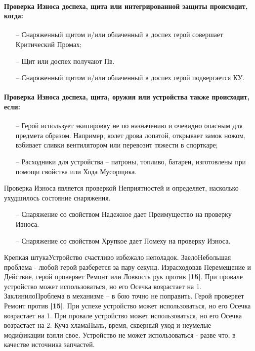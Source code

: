 \paragraph{Проверка Износа доспеха, щита или интегрированной защиты происходит, когда:}
\begin{itemize}
    \item[--] Снаряженный щитом и/или облаченный в доспех герой совершает Критический Промах;
    \item[--] Щит или доспех получают Пв.
    \item[--] Снаряженный щитом и/или облаченный в доспех герой подвергается КУ.
\end{itemize}
\paragraph{Проверка Износа доспеха, щита, оружия или устройства также происходит, если:}
\begin{itemize}
    \item[--] Герой использует экипировку не по назначению и очевидно опасным для предмета образом. Например, колет дрова лопатой, открывает замок ножом, взбивает сливки вентилятором или перевозит тяжести в спорткаре;
    \item[--] Расходники для устройства – патроны, топливо, батареи, изготовлены при помощи свойства или Хода Мусорщика.
\end{itemize}
Проверка Износа является проверкой Неприятностей и определяет, насколько ухудшилось состояние снаряжения.
\begin{itemize}
    \item[--] Снаряжение со свойством Надежное дает Преимущество на проверку Износа.
    \item[--] Снаряжение со свойством Хрупкое дает Помеху на проверку Износа.
\end{itemize}

\trouble
{Крепкая штука}{Устройство счастливо избежало неполадок.}
{Заело}{Небольшая проблема - любой герой разберется за пару секунд. Израсходовав Перемещение и Действие, герой проверяет Ремонт или Ловкость рук против \textbf{|15|}. При провале устройство может использоваться, но его Осечка возрастает на 1.}
{Заклинило}{Проблема в механизме – в бою точно не поправить. Герой проверяет Ремонт против \textbf{|15|}. При успехе устройство может использоваться, но его Осечка возрастает на 1. При провале устройство может использоваться, но его Осечка возрастает на 2. }
{Куча хлама}{Пыль, время, скверный уход и неумелые модификации взяли свое. Устройство не может использоваться - разве что, в качестве источника запчастей.}

